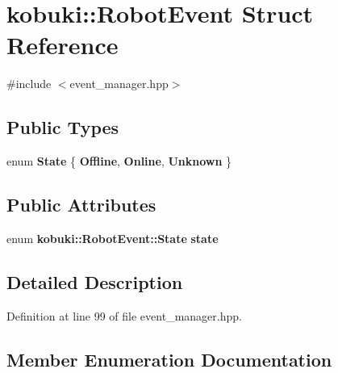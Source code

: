 \section{kobuki\-:\-:\-Robot\-Event \-Struct \-Reference}
\label{structkobuki_1_1RobotEvent}


{\ttfamily \#include $<$event\-\_\-manager.\-hpp$>$}

\subsection*{\-Public \-Types}
\begin{DoxyCompactItemize}
\item 
enum {\bf \-State} \{ {\bf \-Offline}, 
{\bf \-Online}, 
{\bf \-Unknown}
 \}
\end{DoxyCompactItemize}
\subsection*{\-Public \-Attributes}
\begin{DoxyCompactItemize}
\item 
enum {\bf kobuki\-::\-Robot\-Event\-::\-State} {\bf state}
\end{DoxyCompactItemize}


\subsection{\-Detailed \-Description}


\-Definition at line 99 of file event\-\_\-manager.\-hpp.



\subsection{\-Member \-Enumeration \-Documentation}
